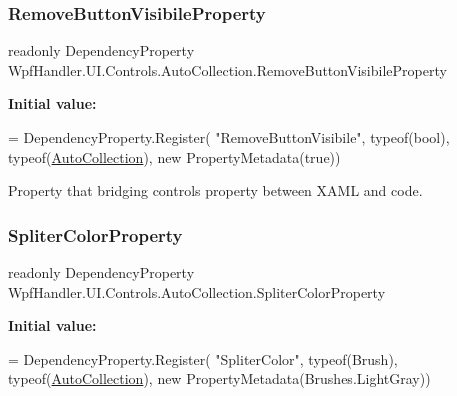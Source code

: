 \subsubsection{\texorpdfstring{Remove\+Button\+Visibile\+Property}{RemoveButtonVisibileProperty}}
{\footnotesize\ttfamily readonly Dependency\+Property Wpf\+Handler.\+U\+I.\+Controls.\+Auto\+Collection.\+Remove\+Button\+Visibile\+Property\hspace{0.3cm}{\ttfamily [static]}}

{\bfseries Initial value\+:}
\begin{DoxyCode}
= DependencyProperty.Register(
          \textcolor{stringliteral}{"RemoveButtonVisibile"}, typeof(\textcolor{keywordtype}{bool}), typeof(\mbox{\hyperlink{class_wpf_handler_1_1_u_i_1_1_controls_1_1_auto_collection_a8bc71a7c43dfeca1d6ff113b12088c28}{AutoCollection}}),
          \textcolor{keyword}{new} PropertyMetadata(\textcolor{keyword}{true}))
\end{DoxyCode}


Property that bridging control\textquotesingle{}s property between X\+A\+ML and code. 

\mbox{\label{class_wpf_handler_1_1_u_i_1_1_controls_1_1_auto_collection_a0d827839ba40e106ecbe9470a7e4c53b}} 
\subsubsection{\texorpdfstring{Spliter\+Color\+Property}{SpliterColorProperty}}
{\footnotesize\ttfamily readonly Dependency\+Property Wpf\+Handler.\+U\+I.\+Controls.\+Auto\+Collection.\+Spliter\+Color\+Property\hspace{0.3cm}{\ttfamily [static]}}

{\bfseries Initial value\+:}
\begin{DoxyCode}
= DependencyProperty.Register(
          \textcolor{stringliteral}{"SpliterColor"}, typeof(Brush), typeof(\mbox{\hyperlink{class_wpf_handler_1_1_u_i_1_1_controls_1_1_auto_collection_a8bc71a7c43dfeca1d6ff113b12088c28}{AutoCollection}}),
          \textcolor{keyword}{new} PropertyMetadata(Brushes.LightGray))
\end{DoxyCode}



